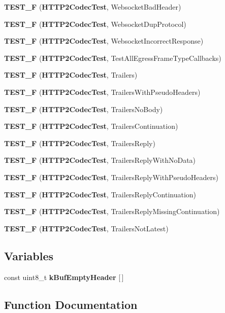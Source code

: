 \begin{DoxyCompactItemize}
{\bf T\+E\+S\+T\+\_\+F} ({\bf H\+T\+T\+P2\+Codec\+Test}, Websocket\+Bad\+Header)
\item 
{\bf T\+E\+S\+T\+\_\+F} ({\bf H\+T\+T\+P2\+Codec\+Test}, Websocket\+Dup\+Protocol)
\item 
{\bf T\+E\+S\+T\+\_\+F} ({\bf H\+T\+T\+P2\+Codec\+Test}, Websocket\+Incorrect\+Response)
\item 
{\bf T\+E\+S\+T\+\_\+F} ({\bf H\+T\+T\+P2\+Codec\+Test}, Test\+All\+Egress\+Frame\+Type\+Callbacks)
\item 
{\bf T\+E\+S\+T\+\_\+F} ({\bf H\+T\+T\+P2\+Codec\+Test}, Trailers)
\item 
{\bf T\+E\+S\+T\+\_\+F} ({\bf H\+T\+T\+P2\+Codec\+Test}, Trailers\+With\+Pseudo\+Headers)
\item 
{\bf T\+E\+S\+T\+\_\+F} ({\bf H\+T\+T\+P2\+Codec\+Test}, Trailers\+No\+Body)
\item 
{\bf T\+E\+S\+T\+\_\+F} ({\bf H\+T\+T\+P2\+Codec\+Test}, Trailers\+Continuation)
\item 
{\bf T\+E\+S\+T\+\_\+F} ({\bf H\+T\+T\+P2\+Codec\+Test}, Trailers\+Reply)
\item 
{\bf T\+E\+S\+T\+\_\+F} ({\bf H\+T\+T\+P2\+Codec\+Test}, Trailers\+Reply\+With\+No\+Data)
\item 
{\bf T\+E\+S\+T\+\_\+F} ({\bf H\+T\+T\+P2\+Codec\+Test}, Trailers\+Reply\+With\+Pseudo\+Headers)
\item 
{\bf T\+E\+S\+T\+\_\+F} ({\bf H\+T\+T\+P2\+Codec\+Test}, Trailers\+Reply\+Continuation)
\item 
{\bf T\+E\+S\+T\+\_\+F} ({\bf H\+T\+T\+P2\+Codec\+Test}, Trailers\+Reply\+Missing\+Continuation)
\item 
{\bf T\+E\+S\+T\+\_\+F} ({\bf H\+T\+T\+P2\+Codec\+Test}, Trailers\+Not\+Latest)
\end{DoxyCompactItemize}
\subsection*{Variables}
\begin{DoxyCompactItemize}
\item 
const uint8\+\_\+t {\bf k\+Buf\+Empty\+Header} [$\,$]
\end{DoxyCompactItemize}


\subsection{Function Documentation}
